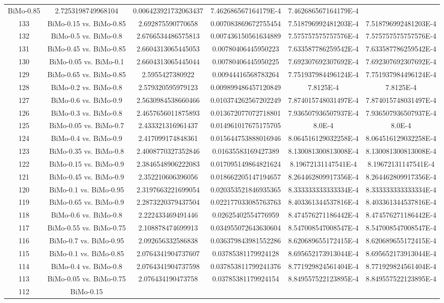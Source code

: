 \documentclass[a4paper,10pt]{article}
\begin{document}
\begin{landscape}
\begin{table}[!htp]
\begin{tabular}{cccccc}
BiMo-0.85&2.7253198749968104&0.006423921732063437&7.462686567164179E-4&7.462686567164179E-4\\133&BiMo-0.15 vs. BiMo-0.85&2.692875590770658&0.007083869672755454&7.518796992481203E-4&7.518796992481203E-4\\132&BiMo-0.5 vs. BiMo-0.8&2.6766534486575813&0.007436150561634889&7.575757575757576E-4&7.575757575757576E-4\\131&BiMo-0.45 vs. BiMo-0.85&2.6604313065445053&0.00780406445950223&7.633587786259542E-4&7.633587786259542E-4\\130&BiMo-0.05 vs. BiMo-0.1&2.6604313065445044&0.00780406445950225&7.692307692307692E-4&7.692307692307692E-4\\129&BiMo-0.65 vs. BiMo-0.85&2.5955427380922&0.00944416568783264&7.751937984496124E-4&7.751937984496124E-4\\128&BiMo-0.2 vs. BiMo-0.8&2.579320595979123&0.009899486457120849&7.8125E-4&7.8125E-4\\127&BiMo-0.6 vs. BiMo-0.9&2.5630984538660466&0.010374262567202249&7.874015748031497E-4&7.874015748031497E-4\\126&BiMo-0.3 vs. BiMo-0.8&2.4657656011875893&0.013672077072718801&7.936507936507937E-4&7.936507936507937E-4\\125&BiMo-0.05 vs. BiMo-0.7&2.433321316961437&0.014961017675175705&8.0E-4&8.0E-4\\124&BiMo-0.4 vs. BiMo-0.9&2.417099174848361&0.015644753888016946&8.064516129032258E-4&8.064516129032258E-4\\123&BiMo-0.35 vs. BiMo-0.8&2.4008770327352846&0.01635583169427389&8.130081300813008E-4&8.130081300813008E-4\\122&BiMo-0.15 vs. BiMo-0.9&2.3846548906222083&0.017095149864821624&8.19672131147541E-4&8.19672131147541E-4\\121&BiMo-0.45 vs. BiMo-0.9&2.352210606396056&0.018662205147194657&8.264462809917356E-4&8.264462809917356E-4\\120&BiMo-0.1 vs. BiMo-0.95&2.3197663221699054&0.020353521846935365&8.333333333333334E-4&8.333333333333334E-4\\119&BiMo-0.65 vs. BiMo-0.9&2.2873220379437504&0.022177033085763763&8.403361344537816E-4&8.403361344537816E-4\\118&BiMo-0.6 vs. BiMo-0.8&2.222433469491446&0.02625402554776959&8.474576271186442E-4&8.474576271186442E-4\\117&BiMo-0.55 vs. BiMo-0.75&2.108878474699913&0.034955072643630604&8.547008547008547E-4&8.547008547008547E-4\\116&BiMo-0.7 vs. BiMo-0.95&2.092656332586838&0.036379843981552286&8.620689655172415E-4&8.620689655172415E-4\\115&BiMo-0.1 vs. BiMo-0.85&2.0764341904737607&0.03785381179924128&8.695652173913044E-4&8.695652173913044E-4\\114&BiMo-0.4 vs. BiMo-0.8&2.0764341904737598&0.037853811799241376&8.771929824561404E-4&8.771929824561404E-4\\113&BiMo-0.05 vs. BiMo-0.75&2.076434190473758&0.03785381179924154&8.849557522123895E-4&8.849557522123895E-4\\112&BiMo-0.15 
\end{tabular}
\end{table}
\end{landscape}
\end{document}
